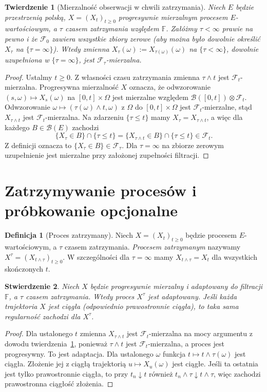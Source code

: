\documentclass[11pt,a4paper,oneside]{report}
\numberwithin{equation}{chapter}
\theoremstyle{plain}
\newtheorem{twierdzenie}{Twierdzenie}[chapter]
\newtheorem{stwierdzenie}[twierdzenie]{Stwierdzenie}
\theoremstyle{definition}
\newtheorem{definicja}{Definicja}[chapter]
\theoremstyle{remark}
\newcommand{\calF}{\mathcal{F}}
\newcommand{\calB}{\mathcal{B}}
\begin{document}
\begin{twierdzenie}[Mierzalność obserwacji w chwili zatrzymania]
\label{thm:sampled}
Niech $E$ będzie przestrzenią polską,
$X=(X_t)_{t\ge0}$ progresywnie mierzalnym procesem
$E$-wartościowym, a $\tau$ czasem zatrzymania
względem $\mathbb F$. Załóżmy $\tau<\infty$
prawie na pewno i że $\calF_0$ zawiera wszystkie
zbiory zerowe (aby można było dowolnie określić
$X_\tau$ na $\{\tau=\infty\}$).
Wtedy zmienna $X_\tau(\omega):=X_{\tau(\omega)}(\omega)$
na $\{\tau<\infty\}$, dowolnie uzupełniona w
$\{\tau=\infty\}$, jest $\calF_\tau$-mierzalna.
\end{twierdzenie}
\begin{proof}
Ustalmy $t\ge0$. Z własności czasu zatrzymania
zmienna $\tau\wedge t$ jest $\calF_t$-mierzalna.
Progresywna mierzalność $X$ oznacza, że odwzorowanie
$(s,\omega)\mapsto X_s(\omega)$ na $[0,t]\times\Omega$
jest mierzalne względem
$\calB([0,t])\otimes\calF_t$.
Odwzorowanie
$\omega\mapsto(\tau(\omega)\wedge t,\omega)$
z $\Omega$ do $[0,t]\times\Omega$ jest
$\calF_t$-mierzalne, stąd
$X_{\tau\wedge t}$ jest $\calF_t$-mierzalna.
Na zdarzeniu $\{\tau\le t\}$ mamy
$X_\tau=X_{\tau\wedge t}$, a więc dla każdego
$B\in\calB(E)$ zachodzi
\[
\{X_\tau\in B\}\cap\{\tau\le t\}
=\{X_{\tau\wedge t}\in B\}\cap\{\tau\le t\}\in\calF_t.
\]
Z definicji oznacza to
$\{X_\tau\in B\}\in\calF_\tau$.
Dla $\tau=\infty$ na zbiorze zerowym uzupełnienie
jest mierzalne przy założonej zupełności filtracji.
\end{proof}

\section{Zatrzymywanie procesów i próbkowanie opcjonalne}
\begin{definicja}[Proces zatrzymany]
Niech $X=(X_t)_{t\ge0}$ będzie procesem $E$-wartościowym,
a $\tau$ czasem zatrzymania. \emph{Procesem zatrzymanym}
nazywamy $X^\tau=(X_{t\wedge\tau})_{t\ge0}$.
W szczególności dla $\tau=\infty$ mamy
$X_{t\wedge\tau}=X_t$ dla wszystkich skończonych $t$.
\end{definicja}

\begin{stwierdzenie}
Niech $X$ będzie progresywnie mierzalny i adaptowany do
filtracji $\mathbb F$, a $\tau$ czasem zatrzymania.
Wtedy proces $X^\tau$ jest adaptowany. Jeśli każda
trajektoria $X$ jest ciągła (odpowiednio prawostronnie
ciągła), to taka sama regularność zachodzi dla $X^\tau$.
\end{stwierdzenie}
\begin{proof}
Dla ustalonego $t$ zmienna $X_{\tau\wedge t}$
jest $\calF_t$-mierzalna na mocy argumentu z dowodu
twierdzenia~\ref{thm:sampled}, ponieważ $\tau\wedge t$
jest $\calF_t$-mierzalna, a proces jest progresywny.
To jest adaptacja. Dla ustalonego $\omega$ funkcja
$t\mapsto t\wedge\tau(\omega)$ jest ciągła.
Złożenie jej z ciągłą trajektorią $u\mapsto X_u(\omega)$
jest ciągłe. Jeśli ta ostatnia jest tylko prawostronnie
ciągła, to przy $t_n\downarrow t$ również
$t_n\wedge\tau\downarrow t\wedge\tau$, więc
zachodzi prawostronna ciągłość złożenia.
\end{proof}
\end{document}

